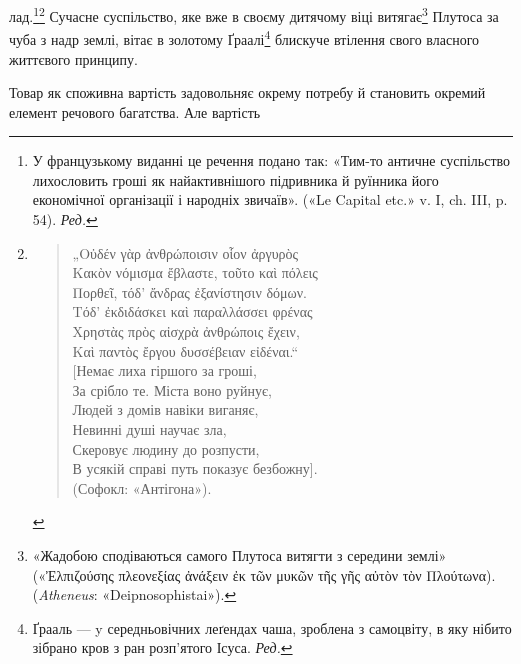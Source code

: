 лад.\footnote*{
У французькому виданні це речення подано так: «Тим-то
античне суспільство лихословить гроші як найактивнішого підривника й руїнника
його економічної організації і народніх звичаїв». («Le Capital etc.» v. I,
ch. III, p. 54). \emph{Ред.}
}\footnote{
\begin{verse}
\vspace{-\dimexpr\baselineskip+\topsep}
\textgreek{„Οὐδέν γὰρ ἀνθρώποισιν οἷον ἀργυρὸς \\
Κακὸν νόμισμα ἔβλαστε, τοῦτο καὶ πόλεις \\
Πορθεῖ, τόδ’ ἄνδρας ἐξανίστησιν δόμων. \\
Τόδ’ ἐκδιδάσκει καὶ παραλλάσσει φρένας \\
Χρηστὰς πρὸς αἰσχρὰ ἀνθρώποις ἔχειν, \\
Καὶ παντὸς ἔργου δυσσέβειαν εἰδέναι.“} \\
\hspace{2em}[Немає лиха гіршого за гроші, \\
\hspace{2em}За срібло те. Міста воно руйнує, \\
\hspace{2em}Людей з домів навіки виганяє, \\
\hspace{2em}Невинні душі научає зла, \\
\hspace{2em}Скеровує людину до розпусти, \\
\hspace{2em}В усякій справі путь показує безбожну]. \\
\hspace{4em}(Софокл: «Антігона»).
\end{verse}
} Сучасне суспільство, яке вже в своєму дитячому
віці витягає\footnote{
«Жадобою сподіваються самого Плутоса витягти з середини землі»
(«\textgreek{Ἐλπιζούσης  πλεονεξίας ἀνάξειν ἐκ τῶν μυκῶν τῆς γῆς αὐτὸν τὸν Πλούτωνα}). (\emph{Atheneus}:
«Deipnosophistai»).
} Плутоса за чуба з надр землі, вітає в золотому
Ґраалі\footnote*{
Ґрааль — y середньовічних леґендах чаша, зроблена з самоцвіту,
в яку нібито зібрано кров з ран розп’ятого Ісуса. \emph{Ред.}
} блискуче втілення свого власного життєвого принципу.

Товар як споживна вартість задовольняє окрему потребу й
становить окремий елемент речового багатства. Але вартість
\parbreak{}  %
